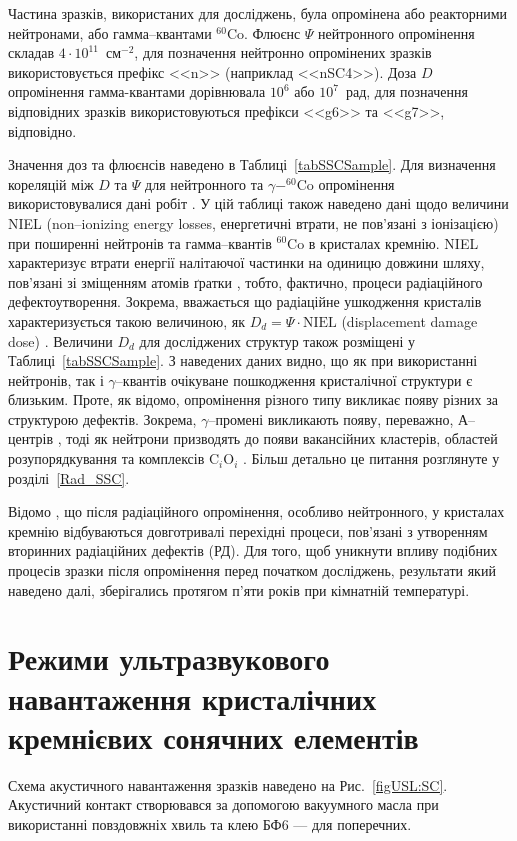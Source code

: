 Частина зразків, використаних для досліджень, була опромінена або реакторними нейтронами, або гамма--квантами $^{60}$Co.
Флюєнс $\Psi$ нейтронного опромінення складав $4\cdot10^{11}$~см$^{-2}$,
для позначення нейтронно опромінених зразків використовується префікс <<n>> (наприклад <<nSC4>>).
Доза $D$ опромінення гамма-квантами дорівнювала $10^6$ або $10^7$~рад, для позначення відповідних зразків використовуються префікси <<g6>> та <<g7>>, відповідно.

Значення доз та флюєнсів наведено в Таблиці~\ref{tabSSCSample}.
Для визначення кореляцій між $D$ та $\Psi$ для нейтронного та $\gamma-^{60}$Co опромінення використовувалися дані робіт \cite{NIEL:Akkerman,Brauning}.
У цій таблиці також наведено дані щодо величини NIEL (non--ionizing energy losses, енергетичні втрати, не пов'язані з іонізацією) при поширенні нейтронів та гамма--квантів $^{60}$Co в кристалах кремнію.
NIEL характеризує втрати енергії налітаючої частинки на одиницю довжини шляху, пов'язані зі зміщенням атомів ґратки \cite{NIEL:Huhtinen,NIEL:Messenger}, тобто, фактично, процеси радіаційного дефектоутворення.
Зокрема, вважається що радіаційне ушкодження кристалів характеризується такою величиною, як $D_d=\Psi\cdot \mbox{NIEL}$ (displacement damage dose) \cite{NIEL:Messenger}.
Величини $D_d$ для досліджених структур також розміщені у Таблиці~\ref{tabSSCSample}.
З наведених даних видно, що як при використанні нейтронів, так і $\gamma$--квантів очікуване пошкодження кристалічної структури є близьким.
Проте, як відомо,  опромінення різного типу викликає появу різних за структурою дефектів.
Зокрема, $\gamma$--промені викликають появу, переважно, А--центрів \cite{NIEL:Jafari,Gamma:Prabhakara,NIEL:Moll}, тоді як нейтрони призводять до появи вакансійних кластерів\cite{Rew:Srour,Junkes}, областей розупорядкування  \cite{Neutron:Arutyunov} та комплексів C$_i$O$_i$ \cite{NIEL:Moll,neutron:Londos}.
Більш детально це питання розглянуте у розділі~\ref{Rad_SSC}.

Відомо \cite{RadBook}, що після радіаційного опромінення, особливо нейтронного, \cite{NIEL:Moll,Rew:Srour} у кристалах кремнію відбуваються довготривалі перехідні процеси, пов'язані з утворенням вторинних радіаційних дефектів (РД).
Для того, щоб уникнути впливу подібних процесів зразки після опромінення перед початком досліджень, результати який наведено далі, зберігались протягом п'яти років при кімнатній температурі.




\section{Режими ультразвукового навантаження кристалічних кремнієвих сонячних елементів\label{SC:USL}}
Схема акустичного навантаження зразків наведено на Рис.~\ref{figUSL:SC}.
Акустичний контакт створювався за допомогою вакуумного масла при використанні повздовжніх хвиль та клею БФ6 --- для поперечних.

